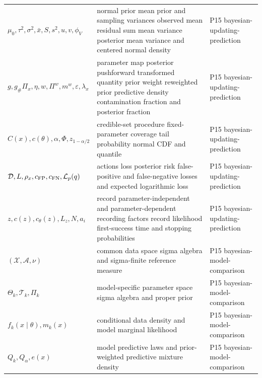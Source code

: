 \begin{longtable}{@{}p{}p{}p{}@{}}
\(\mu_0,\allowbreak \tau^2,\allowbreak \sigma^2,\allowbreak \bar x,\allowbreak S,\allowbreak s^2,\allowbreak u,\allowbreak v,\allowbreak \phi_V\) & normal prior mean prior and sampling variances observed mean residual sum mean variance posterior mean variance and centered normal density & P15 bayesian-\allowbreak{}updating-\allowbreak{}prediction \\
\(g,\allowbreak g_\#\Pi_x,\allowbreak \eta,\allowbreak w,\allowbreak \Pi^w,\allowbreak m^w,\allowbreak \varepsilon,\allowbreak \lambda_x\) & parameter map posterior pushforward transformed quantity prior weight reweighted prior predictive density contamination fraction and posterior fraction & P15 bayesian-\allowbreak{}updating-\allowbreak{}prediction \\
\(C(x),\allowbreak c(\theta),\allowbreak \alpha,\allowbreak \Phi,\allowbreak z_{1-\alpha/2}\) & credible-set procedure fixed-parameter coverage tail probability normal CDF and quantile & P15 bayesian-\allowbreak{}updating-\allowbreak{}prediction \\
\(\mathcal D,\allowbreak L,\allowbreak \rho_x,\allowbreak c_{\rm FP},\allowbreak c_{\rm FN},\allowbreak \mathcal L_p(q)\) & actions loss posterior risk false-positive and false-negative losses and expected logarithmic loss & P15 bayesian-\allowbreak{}updating-\allowbreak{}prediction \\
\(z,\allowbreak c(z),\allowbreak c_\theta(z),\allowbreak L_z,\allowbreak N,\allowbreak a_i\) & record parameter-independent and parameter-dependent recording factors record likelihood first-success time and stopping probabilities & P15 bayesian-\allowbreak{}updating-\allowbreak{}prediction \\
\((\mathcal X,\allowbreak \mathcal A,\allowbreak \nu)\) & common data space sigma algebra and sigma-finite reference measure & P15 bayesian-\allowbreak{}model-\allowbreak{}comparison \\
\(\Theta_k,\allowbreak \mathcal T_k,\allowbreak \Pi_k\) & model-specific parameter space sigma algebra and proper prior & P15 bayesian-\allowbreak{}model-\allowbreak{}comparison \\
\(f_k(x\mid\theta),\allowbreak m_k(x)\) & conditional data density and model marginal likelihood & P15 bayesian-\allowbreak{}model-\allowbreak{}comparison \\
\(Q_k,\allowbreak Q_\alpha,\allowbreak e(x)\) & model predictive laws and prior-weighted predictive mixture density & P15 bayesian-\allowbreak{}model-\allowbreak{}comparison \\

\end{longtable}
